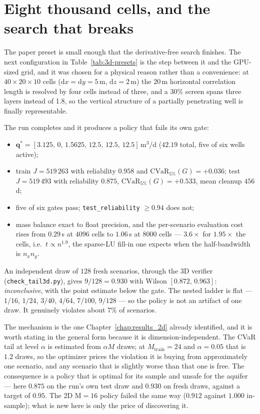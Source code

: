 \section{Eight thousand cells, and the search that breaks}
\label{sec:3d-wall}

The paper preset is small enough that the derivative-free search finishes. The
next configuration in Table~\ref{tab:3d-presets} is the step between it and the
GPU-sized grid, and it was chosen for a physical reason rather than a
convenience: at $40\times20\times10$ cells ($\mathrm{d}x=\mathrm{d}y=5$\,m,
$\mathrm{d}z=2$\,m) the $20$\,m horizontal correlation length is resolved by
four cells instead of three, and a $30\%$ screen spans three layers instead of
1.8, so the vertical structure of a partially penetrating well is finally
representable.

The run completes and it produces a policy that fails its own gate:

\begin{itemize}
  \item $\mathbf{q}^* = [3.125,\,0,\,1.5625,\,12.5,\,12.5,\,12.5]$\,m$^3$/d
    ($42.19$ total, five of six wells active);
  \item train $J=519\,263$ with reliability $0.958$ and
    $\mathrm{CVaR}_{5\%}(G)=+0.036$; test $J=519\,493$ with reliability
    $\mathbf{0.875}$, $\mathrm{CVaR}_{5\%}(G)=+0.533$, mean cleanup $456$\,d;
  \item five of six gates pass; \texttt{test\_reliability} $\ge 0.94$ does not;
  \item mass balance exact to float precision, and the per-scenario evaluation
    cost rises from $0.29$\,s at $4096$ cells to $1.06$\,s at $8000$ cells ---
    $3.6\times$ for $1.95\times$ the cells, i.e.\ $t\propto n^{1.9}$, the
    sparse-LU fill-in one expects when the half-bandwidth is $n_x n_y$.
\end{itemize}

An independent draw of $128$ fresh scenarios, through the 3D verifier
(\texttt{check\_tail3d.py}), gives $9/128 = 0.930$ with Wilson
$[0.872,\,0.963]$: \emph{inconclusive}, with the point estimate below the gate.
The nested ladder is flat --- $1/16$, $1/24$, $3/40$, $4/64$, $7/100$, $9/128$ ---
so the policy is not an artifact of one draw. It genuinely violates about $7\%$
of scenarios.

The mechanism is the one Chapter~\ref{chap:results_2d} already identified, and
it is worth stating in the general form because it is dimension-independent. The
CVaR tail at level $\alpha$ is estimated from $\alpha M$ draws; at
$M_{\text{train}}=24$ and $\alpha=0.05$ that is $1.2$ draws, so the optimizer
prices the violation it is buying from approximately one scenario, and any
scenario that is slightly worse than that one is free. The consequence is a
policy that is optimal for its sample and unsafe for the aquifer --- here
$0.875$ on the run's own test draw and $0.930$ on fresh draws, against a target
of $0.95$. The 2D M$=16$ policy failed the same way ($0.912$ against $1.000$
in-sample); what is new here is only the price of discovering it.

